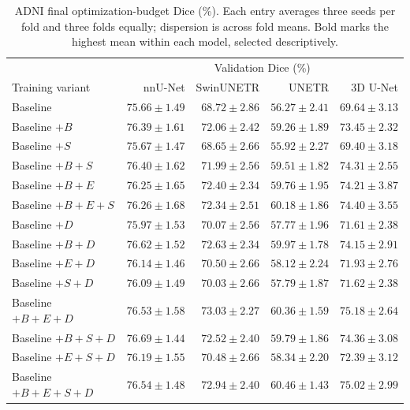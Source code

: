 \documentclass[12pt,a4paper]{article}
\begin{document}
\begin{table}[htbp]
\centering\small{}
\setlength{\tabcolsep}{5pt}
\renewcommand{\arraystretch}{1.15}
\begin{tabular}{@{}lrrrr@{}}
\hline
 & \multicolumn{4}{c}{Validation Dice (\%)} \\
Training variant & nnU-Net & SwinUNETR & UNETR & 3D U-Net \\
\hline
Baseline & $75.66\pm1.49$ & $68.72\pm2.86$ & $56.27\pm2.41$ & $69.64\pm3.13$ \\
Baseline $+B$ & $76.39\pm1.61$ & $72.06\pm2.42$ & $59.26\pm1.89$ & $73.45\pm2.32$ \\
Baseline $+S$ & $75.67\pm1.47$ & $68.65\pm2.66$ & $55.92\pm2.27$ & $69.40\pm3.18$ \\
Baseline $+B+S$ & $76.40\pm1.62$ & $71.99\pm2.56$ & $59.51\pm1.82$ & $74.31\pm2.55$ \\
Baseline $+B+E$ & $76.25\pm1.65$ & $72.40\pm2.34$ & $59.76\pm1.95$ & $74.21\pm3.87$ \\
Baseline $+B+E+S$ & $76.26\pm1.68$ & $72.34\pm2.51$ & $60.18\pm1.86$ & $74.40\pm3.55$ \\
Baseline $+D$ & $75.97\pm1.53$ & $70.07\pm2.56$ & $57.77\pm1.96$ & $71.61\pm2.38$ \\
Baseline $+B+D$ & $76.62\pm1.52$ & $72.63\pm2.34$ & $59.97\pm1.78$ & $74.15\pm2.91$ \\
Baseline $+E+D$ & $76.14\pm1.46$ & $70.50\pm2.66$ & $58.12\pm2.24$ & $71.93\pm2.76$ \\
Baseline $+S+D$ & $76.09\pm1.49$ & $70.03\pm2.66$ & $57.79\pm1.87$ & $71.62\pm2.38$ \\
Baseline $+B+E+D$ & $76.53\pm1.58$ & $\mathbf{73.03\pm2.27}$ & $60.36\pm1.59$ & $\mathbf{75.18\pm2.64}$ \\
Baseline $+B+S+D$ & $\mathbf{76.69\pm1.44}$ & $72.52\pm2.40$ & $59.79\pm1.86$ & $74.36\pm3.08$ \\
Baseline $+E+S+D$ & $76.19\pm1.55$ & $70.48\pm2.66$ & $58.34\pm2.20$ & $72.39\pm3.12$ \\
Baseline $+B+E+S+D$ & $76.54\pm1.48$ & $72.94\pm2.40$ & $\mathbf{60.46\pm1.43}$ & $75.02\pm2.99$ \\
\hline
\end{tabular}
\caption{ADNI final optimization-budget Dice (\%). Each entry averages three seeds per fold and three folds equally; dispersion is across fold means. Bold marks the highest mean within each model, selected descriptively.}
\label{tab:adni-noaug-matrix}
\end{table}
\end{document}
